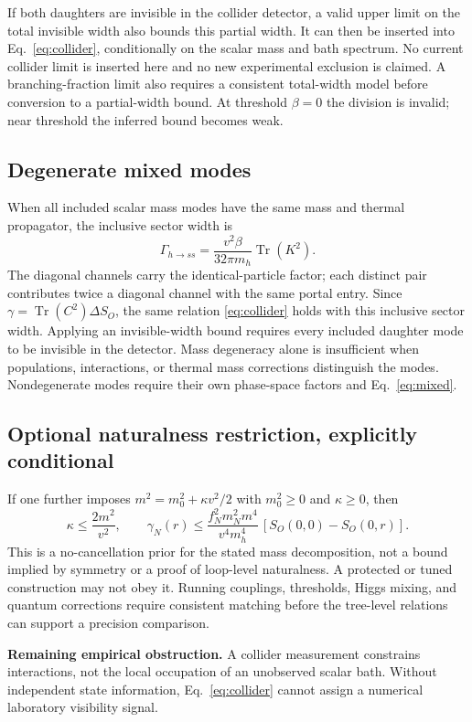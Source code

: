 \documentclass[11pt]{article}
\newcommand{\Tr}{\operatorname{Tr}}
\begin{document}
If both daughters are invisible in the collider detector, a valid upper
limit on the total invisible width also bounds this partial width. It can
then be inserted into Eq.~\eqref{eq:collider}, conditionally on the scalar
mass and bath spectrum. No current collider limit is inserted here and no
new experimental exclusion is claimed. A branching-fraction limit also
requires a consistent total-width model before conversion to a partial-width
bound. At threshold $\beta=0$ the division is invalid; near threshold the
inferred bound becomes weak.

\subsection*{Degenerate mixed modes}
When all included scalar mass modes have the same mass and thermal
propagator, the inclusive sector width is
\begin{equation}
 \Gamma_{h\to ss}=\frac{v^2\beta}{32\pi m_h}\Tr(K^2).
\end{equation}
The diagonal channels carry the identical-particle factor; each distinct
pair contributes twice a diagonal channel with the same portal entry.
Since $\gamma=\Tr(C^2)\Delta S_O$, the same relation
\eqref{eq:collider} holds with this inclusive sector width. Applying an
invisible-width bound requires every included daughter mode to be
invisible in the detector. Mass degeneracy
alone is insufficient when populations, interactions, or thermal mass
corrections distinguish the modes. Nondegenerate modes require their own
phase-space factors and Eq.~\eqref{eq:mixed}.

\subsection*{Optional naturalness restriction, explicitly conditional}
If one further imposes $m^2=m_0^2+\kappa v^2/2$ with
$m_0^2\ge0$ and $\kappa\ge0$, then
\begin{equation}
 \kappa\le\frac{2m^2}{v^2},\qquad
 \gamma_N(r)\le\frac{f_N^2m_N^2m^4}{v^4m_h^4}\,
 [S_O(0,0)-S_O(0,r)].
\end{equation}
This is a no-cancellation prior for the stated mass decomposition, not a
bound implied by symmetry or a proof of loop-level naturalness. A protected
or tuned construction may not obey it. Running couplings, thresholds,
Higgs mixing, and quantum corrections require consistent matching before
the tree-level relations can support a precision comparison.

\textbf{Remaining empirical obstruction.} A collider measurement constrains
interactions, not the local occupation of an unobserved scalar bath. Without
independent state information, Eq.~\eqref{eq:collider} cannot assign a
numerical laboratory visibility signal.
\end{document}
